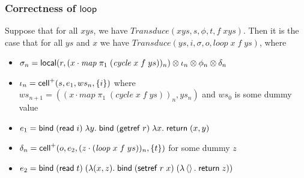 \subsubsection{Correctness of $\mathsf{loop}$}

\begin{lemma}
  Suppose that for all $xys$, we have $\mathit{Transduce}(xys, s,
  \phi, t, f\;xys)$. Then it is the case that for all $ys$ and $x$ we
  have $\mathit{Transduce}(ys, i, \sigma, o, \mathit{loop}\;x\;f\;ys)$, where

  \begin{itemize}
  \item $\sigma_n = \mathsf{local}({r}, {(x \cdot \mathit{map}\;\pi_1\;(\mathit{cycle}\;x\;f\;ys))_n}) \otimes
                      \iota_n \otimes \phi_n \otimes \delta_n$ 
  \item $\iota_n = \mathsf{cell}^{+}({s}, {e_1}, {ws_n}, {\{{i}\}})$ where $ws_{n+1} = ((x \cdot \mathit{map}\;\pi_1\;(\mathit{cycle}\;x\;f\;ys))_n, ys_n)$ and $ws_0$ is some dummy value\\
  \item $e_1 = \mathsf{bind}\; (\mathsf{read}\; i)\; \lambda y.\;\mathsf{bind}\; (\mathsf{getref}\; r)\; \lambda x.\;\mathsf{return}\; (x,y)$ \\
  \item $\delta_n = \mathsf{cell}^{+}({o}, {e_2}, {(z\cdot (\mathit{loop}\;x\;f\;ys))_n}, {\{{t}\}})$ for some dummy $z$ \\ 
  \item $e_2 = \mathsf{bind}\; (\mathsf{read}\; t)\; (\lambda (x,z).\;
               \mathsf{bind}\; (\mathsf{setref}\; r\;x)\; (\lambda \left<\right>.\;\mathsf{return}\; z))$ \\
  \end{itemize}
\end{lemma}

